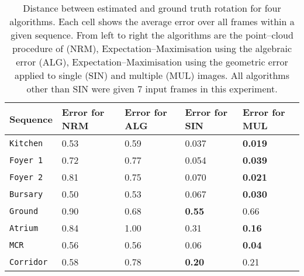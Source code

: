 \begin{table}[tb]
  \centering
  \begin{tabular}{@{}p{2cm}p{3cm}p{3cm}p{3cm}p{3cm}@{}}
    \toprule
    Sequence & Error for NRM & Error for ALG & Error for SIN & Error
    for MUL \\
    \midrule
    \tt{Kitchen}  & 0.53   & 0.59   & 0.037  & \textbf{0.019} \\
    \tt{Foyer 1}   & 0.72   & 0.77   & 0.054  & \textbf{0.039} \\
    \tt{Foyer 2}  & 0.81   & 0.75   & 0.070  & \textbf{0.021} \\
    \tt{Bursary}  & 0.50   & 0.53   & 0.067  & \textbf{0.030} \\
    \tt{Ground}   & 0.90   & 0.68   & \textbf{0.55}   & 0.66 \\
    \tt{Atrium}   & 0.84   & 1.00   & 0.31  & \textbf{0.16} \\
    \tt{MCR}      & 0.56   & 0.56   & 0.06  & \textbf{0.04} \\
    \tt{Corridor} & 0.58   & 0.78   & \textbf{0.20}  & 0.21 \\
    \bottomrule
  \end{tabular}
  \vspace{0.2cm}
  \caption{Distance between estimated and ground truth rotation for
    four algorithms. Each cell shows the average error over all frames
    within a given sequence. From left to right the algorithms are
    the point--cloud procedure of \cite{Furukawa09} (NRM),
    Expectation--Maximisation using the algebraic error (ALG),
    Expectation--Maximisation using the geometric error applied to
    single (SIN) and multiple (MUL) images. All algorithms other than
    SIN were given 7 input frames in this experiment.}
  \label{table:rot-performance}
\end{table}

\begin{figure}[p]
  \centering
  \\
  \caption{}
  \label{fig:error-vs-nframes}
\end{figure}


